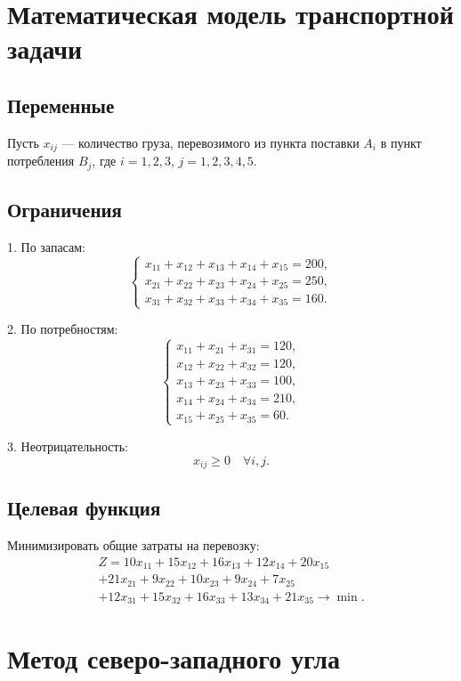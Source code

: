 \documentclass{article}
\begin{document}
\section{Математическая модель транспортной задачи}

\subsection{Переменные}
Пусть \( x_{ij} \) — количество груза, перевозимого из пункта поставки \( A_i \) в пункт потребления \( B_j \), где \( i = 1, 2, 3 \), \( j = 1, 2, 3, 4, 5 \).

\subsection{Ограничения}
1. По запасам:
\[
\begin{cases}
x_{11} + x_{12} + x_{13} + x_{14} + x_{15} = 200, \\
x_{21} + x_{22} + x_{23} + x_{24} + x_{25} = 250, \\
x_{31} + x_{32} + x_{33} + x_{34} + x_{35} = 160.
\end{cases}
\]

2. По потребностям:
\[
\begin{cases}
x_{11} + x_{21} + x_{31} = 120, \\
x_{12} + x_{22} + x_{32} = 120, \\
x_{13} + x_{23} + x_{33} = 100, \\
x_{14} + x_{24} + x_{34} = 210, \\
x_{15} + x_{25} + x_{35} = 60.
\end{cases}
\]

3. Неотрицательность:
\[
x_{ij} \geq 0 \quad \forall i, j.
\]

\subsection{Целевая функция}
Минимизировать общие затраты на перевозку:
\begin{multline}
Z = 10x_{11} + 15x_{12} + 16x_{13} + 12x_{14} + 20x_{15} \\
+ 21x_{21} + 9x_{22} + 10x_{23} + 9x_{24} + 7x_{25} \\
+ 12x_{31} + 15x_{32} + 16x_{33} + 13x_{34} + 21x_{35} \to \min.
\end{multline}

\section{Метод северо-западного угла}
\end{document}
